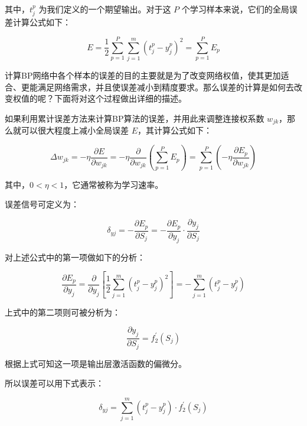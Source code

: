 \documentclass[UTF8]{ctexart}
\begin{document}
其中，$t_{j}^{p}$ 为我们定义的一个期望输出。对于这 $P$ 个学习样本来说，它们的全局误差计算公式如下：

\begin{equation} 
E=\frac{1}{2} \sum_{p=1}^{P} \sum_{j=1}^{m}  (t_{j}^{p} - y_{j}^{p})^2 = \sum_{p=1}^{P} E_p
\end{equation}

计算BP网络中各个样本的误差的目的主要就是为了改变网络权值，使其更加适合、更能满足网络需求，并且使误差减小到精度要求。那么误差的计算是如何去改变权值的呢？下面将对这个过程做出详细的描述。 \par

如果利用累计误差方法来计算BP算法的误差，并用此来调整连接权系数 $w_{jk}$，那么就可以很大程度上减小全局误差 $E$，其计算公式如下：

\begin{equation} 
\Delta w_{jk} = - \eta \frac{\partial E}{\partial w_{jk}} = - \eta \frac{\partial}{\partial w_{jk}} (\sum_{p=1}^{P} E_p) = \sum_{p=1}^{P} (- \eta \frac{\partial E_p}{\partial w_{jk}})
\end{equation}

其中，$0<\eta<1$，它通常被称为学习速率。 \par

误差信号可定义为：

\begin{equation}
\delta_{yj} = - \frac{\partial E_p}{\partial S_j} = - \frac{\partial E_p}{\partial y_j} \cdot \frac{\partial y_j}{\partial S_j}
\end{equation}

对上述公式中的第一项做如下的分析：

\begin{equation}
\frac{\partial E_p}{\partial y_j} = \frac{\partial}{\partial y_j} [\frac{1}{2} \sum_{j=1} ^ {m} (t_{j}^{p} - y_{j}^{p})^2] = - \sum_{j=1}^{m} (t_{j}^{p} - y_{j}^{p})
\end{equation}

上式中的第二项则可被分析为：

\begin{equation}
\frac{\partial y_j}{\partial S_j} = f_2^{'}(S_j)
\end{equation}

根据上式可知这一项是输出层激活函数的偏微分。 \par

所以误差可以用下式表示： \par

\begin{equation}
\delta_{yj} = \sum_{j=1}^{m} (t_{j}^{p} - y_{j}^{p}) \cdot f_2^{'}(S_j)
\end{equation}
\end{document}
